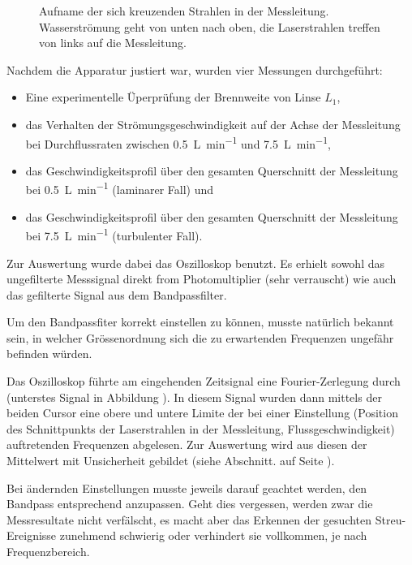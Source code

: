 \begin{figure}[h!t]
    \centering
    \resizebox{.67\textwidth}{!}{}
    \caption{%
        Aufname      der     sich      kreuzenden     Strahlen      in     der
        Messleitung. Wasserstr\"omung   geht   von   unten  nach   oben,   die
        Laserstrahlen treffen von links auf die Messleitung.
    }
    \label{fig:laserkreuzung}
\end{figure}

Nachdem die Apparatur justiert war, wurden vier Messungen durchgef\"uhrt:

\begin{itemize}
    \item
        Eine experimentelle \"Uperpr\"ufung der Brennweite von Linse $L_1$,
    \item
        das  Verhalten  der  Str\"omungsgeschwindigkeit   auf  der  Achse  der
        Messleitung  bei Durchflussraten  zwischen \SI{0.5}{\liter\per\minute}
        und \SI{7.5}{\liter\per\minute},
    \item
        das  Geschwindigkeitsprofil   \"uber  den  gesamten   Querschnitt  der
        Messleitung bei \SI{0.5}{\liter\per\minute} (laminarer Fall) und
    \item
        das  Geschwindigkeitsprofil   \"uber  den  gesamten   Querschnitt  der
        Messleitung bei \SI{7.5}{\liter\per\minute} (turbulenter Fall).
\end{itemize}

Zur  Auswertung wurde  dabei das  Oszilloskop benutzt. Es  erhielt sowohl  das
ungefilterte Messsignal direkt from Photomultiplier (sehr verrauscht) wie auch
das gefilterte Signal aus dem Bandpassfilter.

Um  den  Bandpassfiter  korrekt  einstellen zu  k\"onnen,  musste  nat\"urlich
bekannt sein, in  welcher Gr\"ossenordnung sich die  zu erwartenden Frequenzen
ungef\"ahr befinden w\"urden.

Das  Oszilloskop f\"uhrte  am  eingehenden  Zeitsignal eine  Fourier-Zerlegung
durch (unterstes Signal in Abbildung
).  In  diesem  Signal  wurden  dann mittels  der  beiden  Cursor  eine  obere
und  untere  Limite der  bei  einer  Einstellung (Position  des  Schnittpunkts
der  Laserstrahlen  in  der  Messleitung,  Flussgeschwindigkeit)  auftretenden
Frequenzen  abgelesen. Zur  Auswertung  wird  aus diesen  der  Mittelwert  mit
Unsicherheit gebildet (siehe Abschnitt.
auf Seite
).

Bei  \"andernden  Einstellungen musste  jeweils  darauf  geachtet werden,  den
Bandpass  entsprechend  anzupassen. Geht  dies   vergessen,  werden  zwar  die
Messresultate nicht  verf\"alscht, es  macht aber  das Erkennen  der gesuchten
Streu-Ereignisse zunehmend  schwierig oder verhindert sie  vollkommen, je nach
Frequenzbereich.


